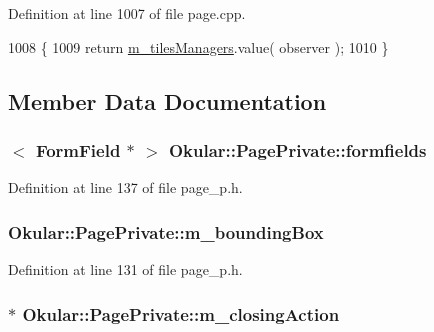 Definition at line 1007 of file page.\+cpp.


\begin{DoxyCode}
1008 \{
1009     \textcolor{keywordflow}{return} \hyperlink{classOkular_1_1PagePrivate_a4735784ca4e23f35a55250e827f62d67}{m\_tilesManagers}.value( observer );
1010 \}
\end{DoxyCode}


\subsection{Member Data Documentation}
\hypertarget{classOkular_1_1PagePrivate_a398106cf0b0b54b59dd2bbc625092151}{
\subsubsection[{formfields}]{$<$ {\bf Form\+Field} $\ast$ $>$ Okular\+::\+Page\+Private\+::formfields}}\label{classOkular_1_1PagePrivate_a398106cf0b0b54b59dd2bbc625092151}


Definition at line 137 of file page\+\_\+p.\+h.

\hypertarget{classOkular_1_1PagePrivate_adf03548582e08ea9cac9944a0962bcf6}{
\subsubsection[{m\+\_\+bounding\+Box}]{ Okular\+::\+Page\+Private\+::m\+\_\+bounding\+Box}}\label{classOkular_1_1PagePrivate_adf03548582e08ea9cac9944a0962bcf6}


Definition at line 131 of file page\+\_\+p.\+h.

\hypertarget{classOkular_1_1PagePrivate_a02392b2b37c1f72ff9d82d418b3da795}{
\subsubsection[{m\+\_\+closing\+Action}]{$\ast$ Okular\+::\+Page\+Private\+::m\+\_\+closing\+Action}}\label{classOkular_1_1PagePrivate_a02392b2b37c1f72ff9d82d418b3da795}


